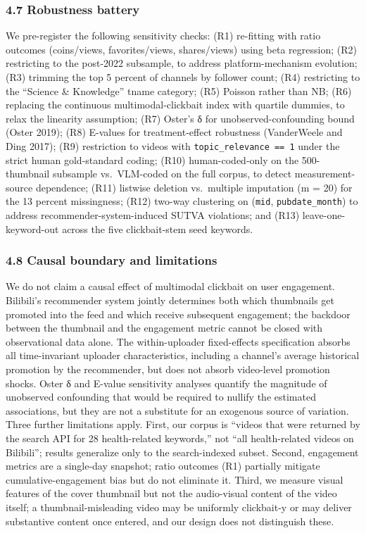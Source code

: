 \documentclass[
  12pt,
]{article}
\begin{document}
\subsubsection{4.7 Robustness battery}\label{robustness-battery}

We pre-register the following sensitivity checks: (R1) re-fitting with
ratio outcomes (coins/views, favorites/views, shares/views) using beta
regression; (R2) restricting to the post-2022 subsample, to address
platform-mechanism evolution; (R3) trimming the top 5 percent of
channels by follower count; (R4) restricting to the ``Science \&
Knowledge'' tname category; (R5) Poisson rather than NB; (R6) replacing
the continuous multimodal-clickbait index with quartile dummies, to
relax the linearity assumption; (R7) Oster's δ for
unobserved-confounding bound (Oster 2019); (R8) E-values for
treatment-effect robustness (VanderWeele and Ding 2017); (R9)
restriction to videos with \texttt{topic\_relevance\ ==\ 1} under the
strict human gold-standard coding; (R10) human-coded-only on the
500-thumbnail subsample vs.~VLM-coded on the full corpus, to detect
measurement-source dependence; (R11) listwise deletion vs.~multiple
imputation (m = 20) for the 13 percent missingness; (R12) two-way
clustering on (\texttt{mid}, \texttt{pubdate\_month}) to address
recommender-system-induced SUTVA violations; and (R13)
leave-one-keyword-out across the five clickbait-stem seed keywords.

\subsubsection{4.8 Causal boundary and
limitations}\label{causal-boundary-and-limitations}

We do not claim a causal effect of multimodal clickbait on user
engagement. Bilibili's recommender system jointly determines both which
thumbnails get promoted into the feed and which receive subsequent
engagement; the backdoor between the thumbnail and the engagement metric
cannot be closed with observational data alone. The within-uploader
fixed-effects specification absorbs all time-invariant uploader
characteristics, including a channel's average historical promotion by
the recommender, but does not absorb video-level promotion shocks. Oster
δ and E-value sensitivity analyses quantify the magnitude of unobserved
confounding that would be required to nullify the estimated
associations, but they are not a substitute for an exogenous source of
variation. Three further limitations apply. First, our corpus is
``videos that were returned by the search API for 28 health-related
keywords,'' not ``all health-related videos on Bilibili''; results
generalize only to the search-indexed subset. Second, engagement metrics
are a single-day snapshot; ratio outcomes (R1) partially mitigate
cumulative-engagement bias but do not eliminate it. Third, we measure
visual features of the cover thumbnail but not the audio-visual content
of the video itself; a thumbnail-misleading video may be uniformly
clickbait-y or may deliver substantive content once entered, and our
design does not distinguish these.
\end{document}
